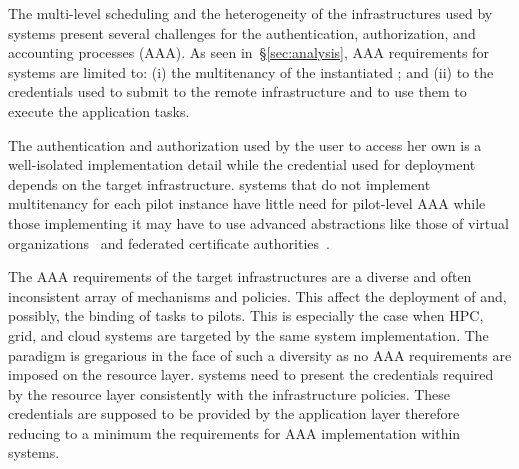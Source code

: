 \documentclass{sig-alternate}
\begin{document}

The multi-level scheduling and the heterogeneity of the infrastructures used by
\pilot systems present several challenges for the authentication, authorization,
and accounting processes (AAA). As seen in~\S\ref{sec:analysis}, AAA
requirements for \pilot systems are limited to: (i) the multitenancy of the
instantiated \pilots; and (ii) to the credentials used to submit \pilots to the
remote infrastructure and to use them to execute the application tasks.

The authentication and authorization used by the user to access her own \pilots
is a well-isolated implementation detail while the credential used for \pilot
deployment depends on the target infrastructure. \pilot systems that do not
implement multitenancy for each pilot instance have little need for pilot-level
AAA while those implementing it may have to use advanced abstractions like those
of virtual organizations~\cite{foster2001} and federated certificate
authorities~\cite{horwitz2002}.

The AAA requirements of the target infrastructures are a diverse and often
inconsistent array of mechanisms and policies. This affect the deployment of
\pilots and, possibly, the binding of tasks to pilots. This is especially the
case when HPC, grid, and cloud systems are targeted by the same \pilot system
implementation. The \pilot paradigm is gregarious in the face of such a
diversity as no AAA requirements are imposed on the resource layer. \pilot
systems need to present the credentials required by the resource layer
consistently with the infrastructure policies. These credentials are supposed to
be provided by the application layer therefore reducing to a minimum the
requirements for AAA implementation within \pilot systems.

\end{document}
